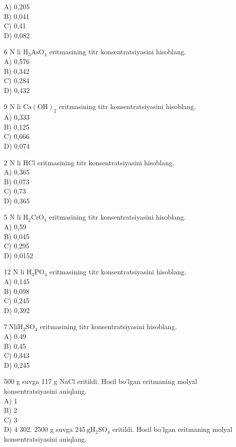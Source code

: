 A) 0,205\\
B) 0,041\\
C) 0,41\\
D) 0,082
  \item 6 N li $\mathrm{H}_{3} \mathrm{AsO}_{4}$ eritmasining titr konsentratsiyasini hisoblang.\\
A) 0,576\\
B) 0,342\\
C) 0,284\\
D) 0,432
  \item 9 N li $\mathrm{Ca}(\mathrm{OH})_{2}$ eritmasining titr konsentratsiyasini hisoblang.\\
A) 0,333\\
B) 0,125\\
C) 0,666\\
D) 0,074
  \item 2 N li HCl eritmasining titr konsentratsiyasini hisoblang.\\
A) 0,365\\
B) 0,073\\
C) 0,73\\
D) 0,365
  \item 5 N li $\mathrm{H}_{2} \mathrm{CrO}_{4}$ eritmasining titr konsentratsiyasini hisoblang.\\
A) 0,59\\
B) 0,045\\
C) 0,295\\
D) 0,0152
  \item 12 N li $\mathrm{H}_{3} \mathrm{PO}_{4}$ eritmasining titr konsentratsiyasini hisoblang.\\
A) 0,145\\
B) 0,098\\
C) 0,245\\
D) 0,392
  \item $7 \mathrm{~N} \mathrm{li} \mathrm{H}_{2} \mathrm{SO}_{4}$ eritmasining titr konsentratsiyasini hisoblang.\\
A) 0,49\\
B) 0,45\\
C) 0,343\\
D) 0,245
  \item 500 g suvga 117 g NaCl eritildi. Hosil bo'lgan eritmaning molyal konsentratsiyasini aniqlang.\\
A) 1\\
B) 2\\
C) 3\\
D) 4
302. 2500 g suvga $245 \mathrm{~g} \mathrm{H}_{2} \mathrm{SO}_{4}$ eritildi. Hosil bo'lgan eritmaning molyal konsentratsiyasini aniqlang.\\
